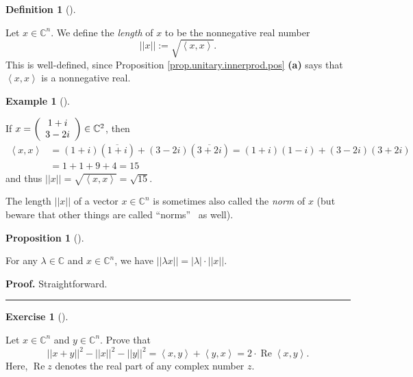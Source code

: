 \documentclass[numbers=enddot,12pt,final,onecolumn,notitlepage]{scrartcl}%
\newcounter{exer}
\numberwithin{exer}{subsection}
\theoremstyle{definition}
\newtheorem{prop}[theo]{Proposition}
\newenvironment{proposition}[1][]
{\begin{prop}[#1]\begin{leftbar}}
{\end{leftbar}\end{prop}}
\newtheorem{defi}[theo]{Definition}
\newenvironment{definition}[1][]
{\begin{defi}[#1]\begin{leftbar}}
{\end{leftbar}\end{defi}}
\newtheorem{exam}[theo]{Example}
\newenvironment{example}[1][]
{\begin{exam}[#1]\begin{leftbar}}
{\end{leftbar}\end{exam}}
\newtheorem{exmp}[exer]{Exercise}
\newenvironment{exercise}[1][]
{\begin{exmp}[#1]\begin{leftbar}}
{\end{leftbar}\end{exmp}}
\newenvironment{proof}[1][Proof]{\noindent\textbf{#1.} }{\ \rule{0.5em}{0.5em}}
\begin{document}
\begin{definition}
\label{def.unitary.innerprod.len}Let $x\in\mathbb{C}^{n}$. We define the
\emph{length} of $x$ to be the nonnegative real number
\[
\left\vert \left\vert x\right\vert \right\vert :=\sqrt{\left\langle
x,x\right\rangle }.
\]
This is well-defined, since Proposition \ref{prop.unitary.innerprod.pos}
\textbf{(a)} says that $\left\langle x,x\right\rangle $ is a nonnegative real.
\end{definition}

\begin{example}
If $x=\left(
\begin{array}
[c]{c}%
1+i\\
3-2i
\end{array}
\right)  \in\mathbb{C}^{2}$, then%
\begin{align*}
\left\langle x,x\right\rangle  &  =\left(  1+i\right)  \left(  \overline
{1+i}\right)  +\left(  3-2i\right)  \left(  \overline{3+2i}\right)  =\left(
1+i\right)  \left(  1-i\right)  +\left(  3-2i\right)  \left(  3+2i\right) \\
&  =1+1+9+4=15
\end{align*}
and thus $\left\vert \left\vert x\right\vert \right\vert =\sqrt{\left\langle
x,x\right\rangle }=\sqrt{15}$.
\end{example}

The length $\left\vert \left\vert x\right\vert \right\vert $ of a vector
$x\in\mathbb{C}^{n}$ is sometimes also called the \emph{norm} of $x$ (but
beware that other things are called \textquotedblleft norms\textquotedblright%
\ as well).

\begin{proposition}
For any $\lambda\in\mathbb{C}$ and $x\in\mathbb{C}^{n}$, we have $\left\vert
\left\vert \lambda x\right\vert \right\vert =\left\vert \lambda\right\vert
\cdot\left\vert \left\vert x\right\vert \right\vert $.
\end{proposition}

\begin{proof}
Straightforward.
\end{proof}

\begin{exercise}
\label{exe.unitary.innerprod.x+y} Let $x\in\mathbb{C}^{n}$ and
$y\in\mathbb{C}^{n}$. Prove that
\[
\left\vert \left\vert x+y\right\vert \right\vert ^{2}-\left\vert \left\vert
x\right\vert \right\vert ^{2}-\left\vert \left\vert y\right\vert \right\vert
^{2}=\left\langle x,y\right\rangle +\left\langle y,x\right\rangle
=2\cdot\operatorname*{Re}\left\langle x,y\right\rangle .
\]
Here, $\operatorname*{Re}z$ denotes the real part of any complex number $z$.
\end{exercise}
\end{document}
